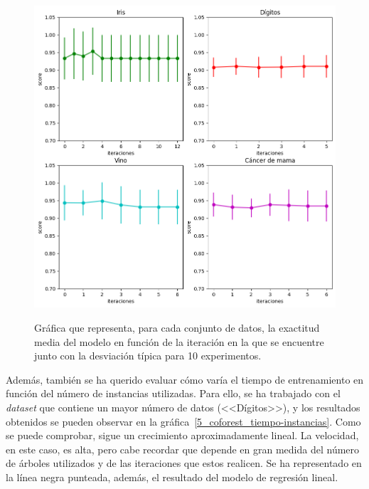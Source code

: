\begin{figure}[h]
	\caption{Gráfica que representa, para cada conjunto de datos, la exactitud media del modelo en función de la iteración en la que se encuentre junto con la desviación típica para 10 experimentos.}
	\centering
	\includegraphics[width=\textwidth]{../img/memoria/5_coforest_score-iteraciones_individual}
	\label{5_coforest_score-iteraciones_individual}
\end{figure}


Además, también se ha querido evaluar cómo varía el tiempo de entrenamiento en función del número de instancias utilizadas. Para ello, se ha trabajado con el \textit{dataset} que contiene un mayor número de datos (<<Dígitos>>), y los resultados obtenidos se pueden observar en la gráfica~\ref{5_coforest_tiempo-instancias}. Como se puede comprobar, sigue un crecimiento aproximadamente lineal. La velocidad, en este caso, es alta, pero cabe recordar que depende en gran medida del número de árboles utilizados y de las iteraciones que estos realicen. Se ha representado en la línea negra punteada, además, el resultado del modelo de regresión lineal.


